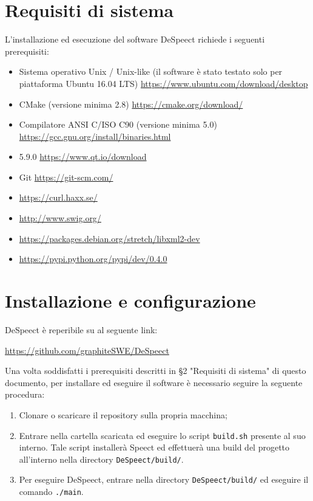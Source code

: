 \documentclass[openany,12pt,a4paper]{report}
\begin{document}
	\chapter{Requisiti di sistema}
	
	L'installazione ed esecuzione del software DeSpeect richiede i seguenti prerequisiti:
	
	\begin{itemize}
		\item Sistema operativo Unix / Unix-like (il software è stato testato solo per piattaforma Ubuntu 16.04 LTS)
		\subitem \url{https://www.ubuntu.com/download/desktop}
		\item CMake (versione minima 2.8)
		\subitem \url{https://cmake.org/download/}
		\item Compilatore ANSI C/ISO C90  (versione minima 5.0)
		\subitem \url{https://gcc.gnu.org/install/binaries.html}
		\item {} 5.9.0
		\subitem \url{https://www.qt.io/download}
		\item Git
		\subitem \url{https://git-scm.com/} 
		\item {}
		\subitem \url{https://curl.haxx.se/}
		\item {}
		\subitem \url{http://www.swig.org/}
		\item {}
		\subitem \url{https://packages.debian.org/stretch/libxml2-dev} 
		\item {}
		\subitem \url{https://pypi.python.org/pypi/dev/0.4.0}
	\end{itemize}	
	 
	\chapter{Installazione e configurazione} 
	
	DeSpeect è reperibile su  al seguente link:
	\begin{center}
		\url{https://github.com/graphiteSWE/DeSpeect}
	\end{center}
	
	\noindent Una volta soddisfatti i prerequisiti descritti in §2 "Requisiti di sistema" di questo documento, per installare ed eseguire il software è necessario seguire la seguente procedura:
	\begin{enumerate}
		\item Clonare o scaricare il repository sulla propria macchina;
		\item Entrare nella cartella scaricata ed eseguire lo script \verb|build.sh| presente al suo interno. Tale script installerà Speect ed effettuerà una build del progetto all'interno nella directory \verb|DeSpeect/build/|.
		\item Per eseguire DeSpeect, entrare nella directory \verb|DeSpeect/build/| ed eseguire il comando \verb|./main|.
	\end{enumerate}
	
\end{document}
